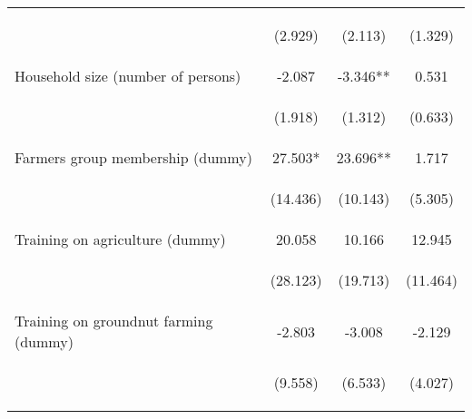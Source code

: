 \begin{center}
\begin{tabular}{lccc}
\vspace{4pt} & \begin{footnotesize}(2.929)\end{footnotesize} & \begin{footnotesize}(2.113)\end{footnotesize} & \begin{footnotesize}(1.329)\end{footnotesize} \\
Household size (number of persons) & -2.087 & -3.346** & 0.531 \\
\vspace{4pt} & \begin{footnotesize}(1.918)\end{footnotesize} & \begin{footnotesize}(1.312)\end{footnotesize} & \begin{footnotesize}(0.633)\end{footnotesize} \\
Farmers group membership (dummy) & 27.503* & 23.696** & 1.717 \\
\vspace{4pt} & \begin{footnotesize}(14.436)\end{footnotesize} & \begin{footnotesize}(10.143)\end{footnotesize} & \begin{footnotesize}(5.305)\end{footnotesize} \\
Training on agriculture (dummy) & 20.058 & 10.166 & 12.945 \\
\vspace{4pt} & \begin{footnotesize}(28.123)\end{footnotesize} & \begin{footnotesize}(19.713)\end{footnotesize} & \begin{footnotesize}(11.464)\end{footnotesize} \\
Training on groundnut farming (dummy) & -2.803 & -3.008 & -2.129 \\
\vspace{4pt} & \begin{footnotesize}(9.558)\end{footnotesize} & \begin{footnotesize}(6.533)\end{footnotesize} & \begin{footnotesize}(4.027)\end{footnotesize} \\

\end{tabular}
\end{center}
